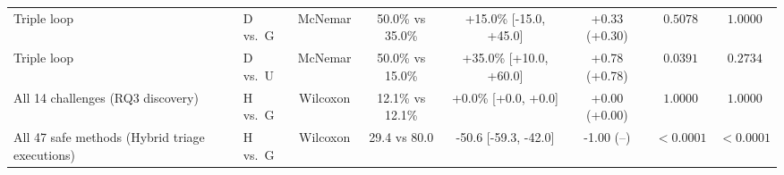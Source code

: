 \begin{table}[t]
\begin{tabular}{llcccccc}
Triple loop & D vs.\ G & McNemar & 50.0\% vs 35.0\% & +15.0\% [-15.0, +45.0] & +0.33 (+0.30) & $0.5078$ & $1.0000$ \\
Triple loop & D vs.\ U & McNemar & 50.0\% vs 15.0\% & +35.0\% [+10.0, +60.0] & +0.78 (+0.78) & $0.0391$ & $0.2734$ \\
All 14 challenges (RQ3 discovery) & H vs.\ G & Wilcoxon & 12.1\% vs 12.1\% & +0.0\% [+0.0, +0.0] & +0.00 (+0.00) & $1.0000$ & $1.0000$ \\
All 47 safe methods (Hybrid triage executions) & H vs.\ G & Wilcoxon & 29.4 vs 80.0 & -50.6 [-59.3, -42.0] & -1.00 (--) & $<0.0001$ & $<0.0001$ \\
\bottomrule
\end{tabular}
\end{table}

